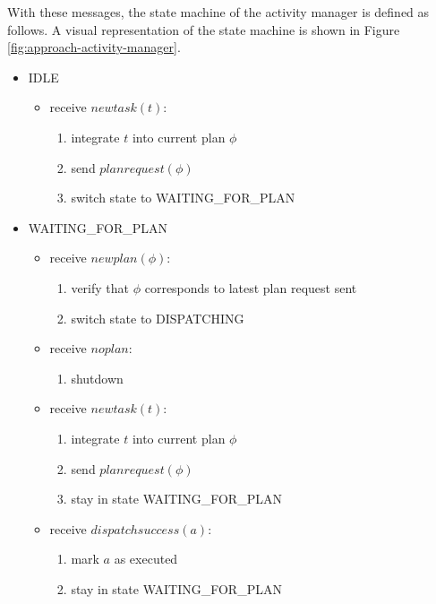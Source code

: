 With these messages, the state machine of the activity manager is defined as follows.
A visual representation of the state machine is shown in Figure \ref{fig:approach-activity-manager}.

\begin{itemize}
    \item IDLE
    \begin{itemize}
        \item receive $newtask(t)$:
        \begin{enumerate}
            \item integrate $t$ into current plan $\phi$
            \item send $planrequest(\phi)$
            \item switch state to WAITING\_FOR\_PLAN
        \end{enumerate}
    \end{itemize}
    \item WAITING\_FOR\_PLAN
    \begin{itemize}
        \item receive $newplan(\phi)$:
        \begin{enumerate}
            \item verify that $\phi$ corresponds to latest plan request sent
            \item switch state to DISPATCHING
        \end{enumerate}
        \item receive $noplan$:
        \begin{enumerate}
            \item shutdown
        \end{enumerate}
        \item receive $newtask(t)$:
        \begin{enumerate}
            \item integrate $t$ into current plan $\phi$
            \item send $planrequest(\phi)$
            \item stay in state WAITING\_FOR\_PLAN
        \end{enumerate}
        \item receive $dispatchsuccess(a)$:
        \begin{enumerate}
            \item mark $a$ as executed
            \item stay in state WAITING\_FOR\_PLAN
        \end{enumerate}

\end{itemize}
\end{itemize}
